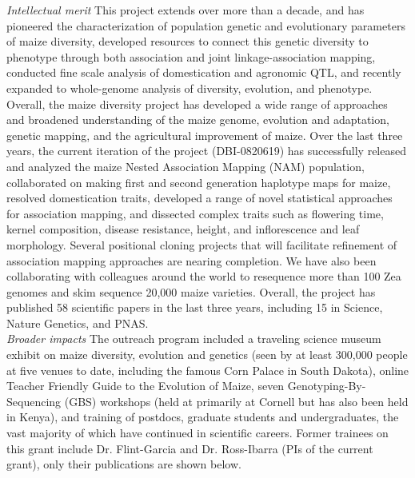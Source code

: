 \emph{Intellectual merit} This project extends over more than a decade, and has pioneered the characterization of population genetic and evolutionary parameters of maize diversity, developed resources to connect this genetic diversity to phenotype through both association and joint linkage-association mapping, conducted fine scale analysis of domestication and agronomic QTL, and recently expanded to whole-genome analysis of diversity, evolution, and phenotype. Overall, the maize diversity project has developed a wide range of approaches and broadened understanding of the maize genome, evolution and adaptation, genetic mapping, and the agricultural improvement of maize. Over the last three years, the current iteration of the project (DBI-0820619) has successfully released and analyzed the maize Nested Association Mapping (NAM) population, collaborated on making first and second generation haplotype maps for maize, resolved domestication traits, developed a range of novel statistical approaches for association mapping, and dissected complex traits such as flowering time, kernel composition, disease resistance, height, and inflorescence and leaf morphology. Several positional cloning projects that will facilitate refinement of association mapping approaches are nearing completion.  We have also been collaborating with colleagues around the world to resequence more than 100 Zea genomes and skim sequence 20,000 maize varieties. Overall, the project has published 58 scientific papers in the last three years, including 15 in Science, Nature Genetics, and PNAS. \\
\emph{Broader impacts} The outreach program included a traveling science museum exhibit on maize diversity, evolution and genetics (seen by at least 300,000 people at five venues to date, including the famous Corn Palace in South Dakota), online Teacher Friendly Guide to the Evolution of Maize, seven Genotyping-By-Sequencing (GBS) workshops (held at primarily at Cornell but has also been held in Kenya), and training of postdocs, graduate students and undergraduates, the vast majority of which have continued in scientific careers.  Former trainees on this grant include Dr. Flint-Garcia  and Dr. Ross-Ibarra  (PIs of the current grant), only their publications are shown below.

